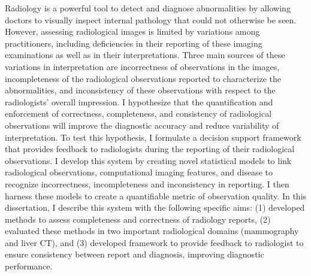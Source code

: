 Radiology is a powerful tool to detect and diagnose abnormalities by allowing doctors to visually inspect internal pathology that could not otherwise be seen. However, assessing radiological images is limited by variations among practitioners, including deficiencies in their reporting of these imaging examinations as well as in their interpretations. Three main sources of these variations in interpretation are incorrectness of observations in the images, incompleteness of the radiological observations reported to characterize the abnormalities, and inconsistency of these observations with respect to the radiologists' overall impression. I hypothesize that the quantification and enforcement of correctness, completeness, and consistency of radiological observations will improve the diagnostic accuracy and reduce variability of interpretation. To test this hypothesis, I formulate a decision support framework that provides feedback to radiologists during the reporting of their radiological observations. I develop this system by creating novel statistical models to link radiological observations, computational imaging features, and disease to recognize incorrectness, incompleteness and inconsistency in reporting. I then harness these models to create a quantifiable metric of observation quality. In this dissertation, I describe this system with the following specific aims: (1) developed methods to assess completeness and correctness of radiology reports, (2) evaluated these methods in two important radiological domains (mammography and liver CT), and (3) developed framework to provide feedback to radiologist to ensure consistency between report and diagnosis, improving diagnostic performance.